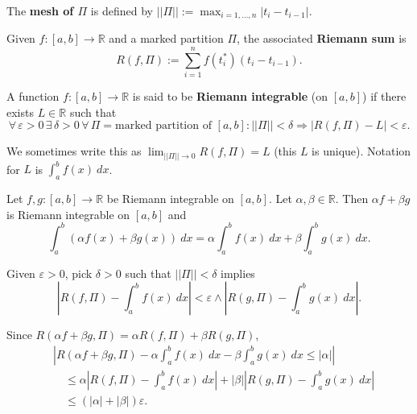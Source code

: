 \documentclass{notes}
\begin{document}
  \begin{defn}
    The {\boldmath \bfseries mesh of $\Pi$} is defined by $|| \Pi || := \max_{i = 1, \dots, n} \left | t_i - t_{i - 1} \right |$.
  \end{defn}
  
  \begin{defn}
    Given $f \colon [a, b] \to \mathbb R$ and a marked partition $\Pi$, the associated {\boldmath \bfseries Riemann sum} is 
    \[
      R(f, \Pi) := \sum_{i = 1}^n f(t^*_i) (t_i - t_{i - 1}).
    \]
  \end{defn}
  
  \newpage
  
  \begin{defn}
    A function $f \colon [a, b] \to \mathbb R$ is said to be {\boldmath \bfseries Riemann integrable} (on $[a, b]$) if there exists $L \in \mathbb R$ such that 
    \[
      \forall \, \varepsilon > 0 \, \exists \, \delta > 0 \, \forall \, \Pi = \text{marked partition of $[a, b]$}: || \Pi || < \delta \Rightarrow \left | R(f, \Pi) - L \right | < \varepsilon.
    \]
    
    We sometimes write this as $\lim_{|| \Pi || \to 0} R(f, \Pi) = L$ (this $L$ is unique).
    Notation for $L$ is $\int_a^b f(x)\ dx$.
  \end{defn}
  
  \begin{lem}
    Let $f, g \colon [a, b] \to \mathbb R$ be Riemann integrable on $[a, b]$.
    Let $\alpha, \beta \in \mathbb R$.
    Then $\alpha f + \beta g$ is Riemann integrable on $[a, b]$ and 
    \[
      \int_a^b (\alpha f(x) + \beta g(x))\ dx = \alpha \int_a^b f(x)\ dx + \beta \int_a^b g(x)\ dx.
    \]
  \end{lem}
  
  \begin{prf}
    Given $\varepsilon > 0$, pick $\delta > 0$ such that $|| \Pi || < \delta$ implies 
    \[
      \left | R(f, \Pi) - \int_a^b f(x)\ dx \right | < \varepsilon \land \left | R(g, \Pi) - \int_a^b g(x)\ dx \right |.
    \]
    
    Since $R(\alpha f + \beta g, \Pi) = \alpha R(f, \Pi) + \beta R(g, \Pi)$, 
    \begin{align*}
      &\left | R(\alpha f + \beta g, \Pi) - \alpha \int_a^b f(x)\ dx - \beta \int_a^b g(x)\ dx \leq \left | \alpha \right | \right | \\ 
      &\quad \leq \alpha \left | R(f, \Pi) - \int_a^b f(x)\ dx \right | + \left | \beta \right | \left | R(g, \Pi) - \int_a^b g(x)\ dx \right | \\ 
      &\quad \leq (\left | \alpha \right | + \left | \beta \right |) \varepsilon.
    \end{align*}
  \end{prf}
  
\end{document}
